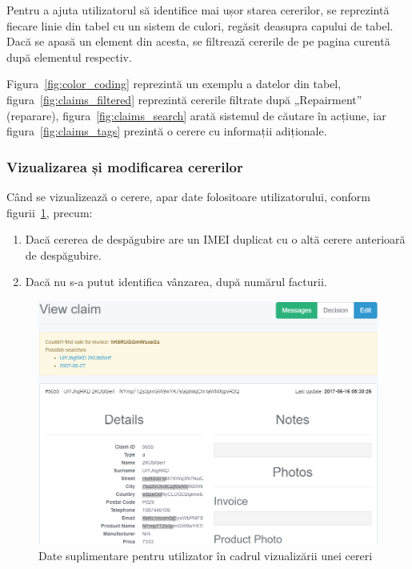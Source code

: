 	Pentru a ajuta utilizatorul să identifice mai ușor starea cererilor, se reprezintă fiecare linie din tabel cu un sistem de culori, regăsit deasupra capului de tabel.
	Dacă se apasă un element din acesta, se filtrează cererile de pe pagina curentă după elementul respectiv.

	Figura~\ref{fig:color_coding} reprezintă un exemplu a datelor din tabel, figura~\ref{fig:claims_filtered} reprezintă cererile filtrate după „Repairment” (reparare), figura~\ref{fig:claims_search} arată sistemul de căutare în acțiune, iar figura~\ref{fig:claims_tags} prezintă o cerere cu informații adiționale.

	\subsubsection{Vizualizarea și modificarea cererilor}


	Când se vizualizează o cerere, apar date folositoare utilizatorului, conform figurii~\ref{fig:claims_view}, precum:
	\begin{enumerate}
		\item Dacă cererea de despăgubire are un IMEI duplicat cu o altă cerere anterioară de despăgubire.
		\item Dacă nu s-a putut identifica vânzarea, după numărul facturii.
	\end{enumerate}

	\begin{figure}
		\includegraphics[width=\linewidth]{../imagini/claims_view.png}
		\caption{Date suplimentare pentru utilizator în cadrul vizualizării unei cereri}
		\label{fig:claims_view}
	\end{figure}

